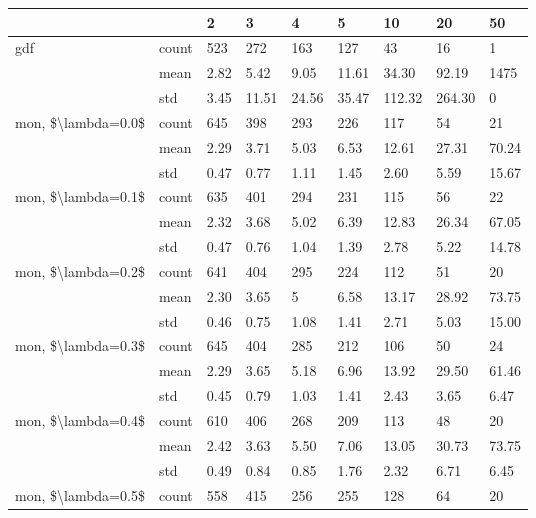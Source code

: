 \begin{tabular}{lllllllll}
\toprule
                   &     &   2  &    3  &    4  &    5  &     10 &     20 &    50 \\
\midrule
gdf & count &  523 &   272 &   163 &   127 &     43 &     16 &     1 \\
                   & mean & 2.82 &  5.42 &  9.05 & 11.61 &  34.30 &  92.19 &  1475 \\
                   & std & 3.45 & 11.51 & 24.56 & 35.47 & 112.32 & 264.30 &     0 \\
mon, \$\textbackslash lambda=0.0\$ & count &  645 &   398 &   293 &   226 &    117 &     54 &    21 \\
                   & mean & 2.29 &  3.71 &  5.03 &  6.53 &  12.61 &  27.31 & 70.24 \\
                   & std & 0.47 &  0.77 &  1.11 &  1.45 &   2.60 &   5.59 & 15.67 \\
mon, \$\textbackslash lambda=0.1\$ & count &  635 &   401 &   294 &   231 &    115 &     56 &    22 \\
                   & mean & 2.32 &  3.68 &  5.02 &  6.39 &  12.83 &  26.34 & 67.05 \\
                   & std & 0.47 &  0.76 &  1.04 &  1.39 &   2.78 &   5.22 & 14.78 \\
mon, \$\textbackslash lambda=0.2\$ & count &  641 &   404 &   295 &   224 &    112 &     51 &    20 \\
                   & mean & 2.30 &  3.65 &     5 &  6.58 &  13.17 &  28.92 & 73.75 \\
                   & std & 0.46 &  0.75 &  1.08 &  1.41 &   2.71 &   5.03 & 15.00 \\
mon, \$\textbackslash lambda=0.3\$ & count &  645 &   404 &   285 &   212 &    106 &     50 &    24 \\
                   & mean & 2.29 &  3.65 &  5.18 &  6.96 &  13.92 &  29.50 & 61.46 \\
                   & std & 0.45 &  0.79 &  1.03 &  1.41 &   2.43 &   3.65 &  6.47 \\
mon, \$\textbackslash lambda=0.4\$ & count &  610 &   406 &   268 &   209 &    113 &     48 &    20 \\
                   & mean & 2.42 &  3.63 &  5.50 &  7.06 &  13.05 &  30.73 & 73.75 \\
                   & std & 0.49 &  0.84 &  0.85 &  1.76 &   2.32 &   6.71 &  6.45 \\
mon, \$\textbackslash lambda=0.5\$ & count &  558 &   415 &   256 &   255 &    128 &     64 &    20 \\

\end{tabular}

